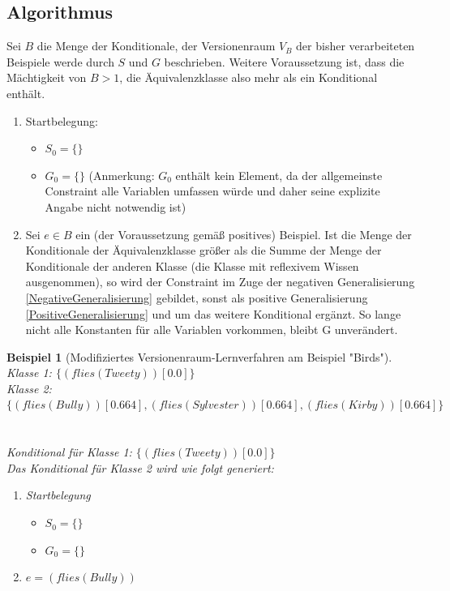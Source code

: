 \documentclass[a4paper, 11pt]{book}
\newtheorem{Bsp}{Beispiel}[section]
\begin{document}
{	\subsection{Algorithmus}
	Sei $ B $ die Menge der Konditionale, der Versionenraum $ V_B $ der bisher verarbeiteten Beispiele werde durch $ S $ und  $ G $ beschrieben. Weitere Voraussetzung ist, dass die Mächtigkeit von $ B  > 1$, die Äquivalenzklasse also mehr als ein Konditional enthält.  
	\begin{enumerate}
		\item Startbelegung:
		\begin{itemize}
			\item $ S_0 = \{\}$ 
			\item $ G_0 = \{\} $ (Anmerkung: $ G_0 $ enthält kein Element, da der allgemeinste Constraint alle Variablen umfassen würde und daher seine explizite Angabe nicht notwendig ist)
		\end{itemize}
		\item Sei $ e \in B $ ein (der Voraussetzung gemäß positives) Beispiel. Ist die Menge der Konditionale der Äquivalenzklasse größer als die Summe der Menge der Konditionale der anderen Klasse (die Klasse mit reflexivem Wissen ausgenommen), so wird der Constraint im Zuge der negativen Generalisierung \ref{NegativeGeneralisierung} gebildet, sonst als positive Generalisierung \ref{PositiveGeneralisierung} und um das weitere Konditional ergänzt. So lange nicht alle Konstanten für alle Variablen vorkommen, bleibt G unverändert. 
	\end{enumerate}
\begin{Bsp}[Modifiziertes Versionenraum-Lernverfahren am Beispiel "{}Birds"{}]
\noindent
Klasse 1: $\{(flies(Tweety))[0.0]\}$\\
Klasse 2: $\{(flies(Bully))[0.664], (flies(Sylvester))[0.664], (flies(Kirby))[0.664]\}$\\
\\\\
Konditional für Klasse 1: $\{(flies(Tweety))[0.0]\}$\\
Das Konditional für Klasse 2 wird wie folgt generiert:\\
\begin{enumerate}
	\item Startbelegung
	\begin{itemize}
		\item $ S_0 = \{\}$ 
		\item $ G_0 = \{\} $
	\end{itemize}
	\item $ e = (flies(Bully)) $

\end{enumerate}
\end{Bsp}}
\end{document}
